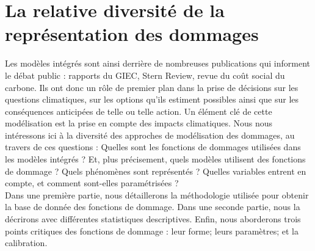 \chapter{La relative diversité de la représentation des dommages}
\label{chapter:litrev}
\newrefsegment





\newpage


Les modèles intégrés sont ainsi derrière de nombreuses publications qui informent le débat public : rapports du GIEC, Stern Review, revue du coût social du carbone. Ils ont donc un rôle de premier plan dans la prise de décisions sur les questions climatiques, sur les options qu'ils estiment possibles ainsi que sur les conséquences anticipées de telle ou telle action. Un élément clé de cette modélisation est la prise en compte des impacts climatiques. Nous nous intéressons ici à la diversité des approches de modélisation des dommages, au travers de ces questions : 
Quelles sont les fonctions de dommages utilisées dans les modèles intégrés ? Et, plus précisement, quels modèles utilisent des fonctions de dommage ? Quels phénomènes sont représentés ? Quelles variables entrent en compte, et comment sont-elles paramétrisées ? \\

Dans une première partie, nous détaillerons la méthodologie utilisée pour obtenir la base de donnée des fonctions de dommage. Dans une seconde partie, nous la décrirons avec différentes statistiques descriptives. Enfin, nous aborderons trois points critiques des fonctions de dommage : leur forme; leurs paramètres; et la calibration. 

